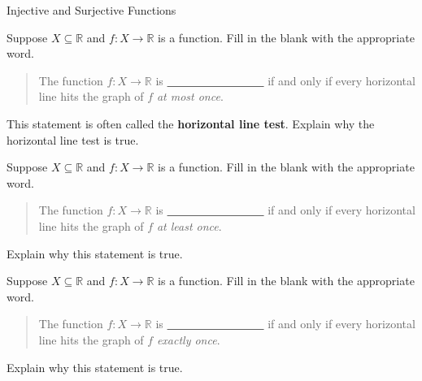 \begin{section}{Injective and Surjective Functions}
\begin{problem}
Suppose $X\subseteq \mathbb{R}$ and $f:X\to \mathbb{R}$ is a function. Fill in the blank with the appropriate word.
\begin{quote}
The function $f:X\to \mathbb{R}$ is \underline{\ \ \ \ \ \ \ \  \ \ \ \ \ \ \ \ \ } if and only if every horizontal line hits the graph of $f$ \emph{at most once}.
\end{quote}
This statement is often called the \textbf{horizontal line test}.  Explain why the horizontal line test is true.
\end{problem}

\begin{problem}
Suppose $X\subseteq \mathbb{R}$ and $f:X\to \mathbb{R}$ is a function. Fill in the blank with the appropriate word.
\begin{quote}
The function $f:X\to \mathbb{R}$ is \underline{\ \ \ \ \ \ \ \  \ \ \ \ \ \ \ \ \ } if and only if every horizontal line hits the graph of $f$ \emph{at least once}.
\end{quote}
Explain why this statement is true.
\end{problem}

\begin{problem}
Suppose $X\subseteq \mathbb{R}$ and $f:X\to \mathbb{R}$ is a function. Fill in the blank with the appropriate word.
\begin{quote}
The function $f:X\to \mathbb{R}$ is \underline{\ \ \ \ \ \ \ \  \ \ \ \ \ \ \ \ \ } if and only if every horizontal line hits the graph of $f$ \emph{exactly once}.
\end{quote}
Explain why this statement is true.
\end{problem}


\end{section}
